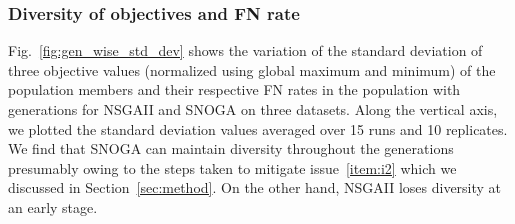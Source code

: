 \subsubsection{Diversity of objectives and FN rate}\label{subsubsec:diversity} Fig.~\ref{fig:gen_wise_std_dev} shows the variation of the standard deviation of three objective values (normalized using global maximum and minimum) of the population members and their respective FN rates in the population with generations for NSGAII and SNOGA on three datasets. Along the vertical axis, we plotted the standard deviation values averaged over 15 runs and 10 replicates. We find that SNOGA can maintain diversity throughout the generations presumably owing to the steps taken to mitigate issue~\ref{item:i2} which we discussed in Section~\ref{sec:method}. On the other hand, NSGAII loses diversity at an early stage.

